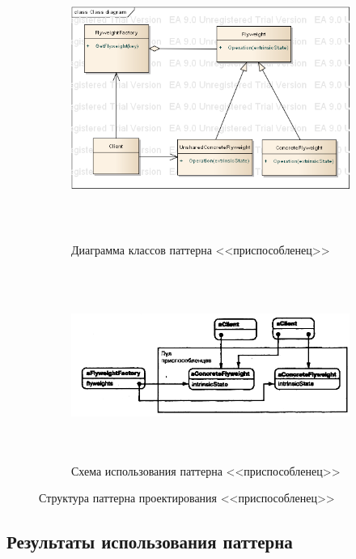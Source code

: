 \begin{figure}[htbp]
  \centering
  \begin{subfigure}[b]{\textwidth}
    \centering
    \includegraphics[width=150mm,height=92mm]{pic/flyweight_uml}
    \caption{Диаграмма классов паттерна <<приспособленец>>}
    \label{pic:fly_uml}
  \end{subfigure}

  \bigskip
  
  \begin{subfigure}[b]{\textwidth}
    \centering
    \includegraphics[width=150mm,height=62mm]{pic/flyweight_usage}
    \caption{Схема использования паттерна <<приспособленец>>}
    \label{pic:fly_usage}
  \end{subfigure}
  \caption{Структура паттерна проектирования <<приспособленец>>}
  \label{pic:fly_scheme}

\end{figure}


\subsection{Результаты использования паттерна}

